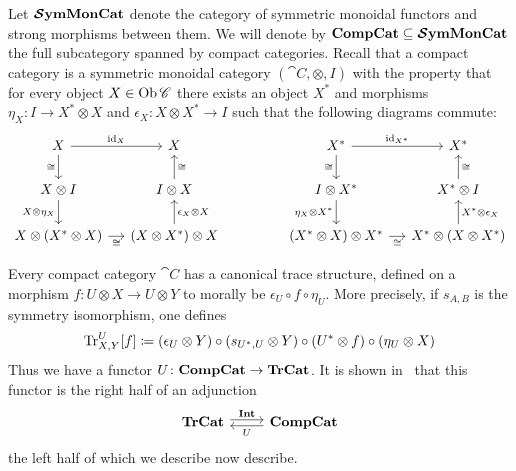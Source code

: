 \documentclass[12pt,oneside,article,draft]{memoir}
\begin{document}
Let $\bm{\mathcal{S}}\mathbf{ymMonCat}$ denote the category of symmetric monoidal functors and strong morphisms between them.
We will denote by $\mathbf{CompCat}\subseteq\bm{\mathcal{S}}\mathbf{ymMonCat}$ the full subcategory spanned by compact categories.
Recall that a compact category is a symmetric monoidal category $(\cat{C},\otimes,I)$ with the property that for every object $X\in\operatorname{Ob}\mathscr{C}$ there exists an object $X^*$ and morphisms $\eta_X\colon I\to X^*\otimes X$ and $\epsilon_X\colon X\otimes X^*\to I$ such that the following diagrams commute:
$$
   \begin{tikzcd}[column sep=small]
      X\arrow[r,"\id_X"]\arrow[d,"\cong"'] & X \\
      X\otimes I\arrow[d,"X\otimes\eta_X"'] & I\otimes X\arrow[u,"\cong"'] \\
      X\otimes(X^*\otimes X)\arrow[r,"\cong"'] & (X\otimes X^*)\otimes X\arrow[u,"\epsilon_X\otimes X"']
   \end{tikzcd}
   \hspace{.6in}
   \begin{tikzcd}[column sep=small]
      X^*\arrow[r,"\id_{X^*}"]\arrow[d,"\cong"'] & X^*\\
      I\otimes X^*\arrow[d,"\eta_X\otimes X^*"'] & X^*\otimes I\arrow[u,"\cong"'] \\
      (X^*\otimes X)\otimes X^*\arrow[r,"\cong"'] & X^*\otimes (X\otimes X^*)\arrow[u,"X^*\otimes\epsilon_X"']
   \end{tikzcd}
$$

Every compact category $\cat{C}$ has a canonical trace structure, defined on a morphism $f\colon U\otimes X\to U\otimes Y$ to morally be $\epsilon_U\circ f\circ \eta_U$.
More precisely, if $s_{A,B}$ is the symmetry isomorphism, one defines
   $$\operatorname{Tr}^U_{X,Y}[f]\coloneqq(\epsilon_U\otimes Y)\circ (s_{U^*,U}\otimes Y)\circ (U^*\otimes f)\circ (\eta_U\otimes X)$$
Thus we have a functor $U\colon\mathbf{CompCat}\to\mathbf{TrCat}$.
It is shown in~\cite{JoyalStreetVerity} that this functor is the right half of an adjunction
\begin{equation}\label{dia:traced compact adjunction}
\begin{tikzcd}
   \TrCat\arrow[r,shift left=.5ex, "\Int"]&\CompCat\arrow[l,shift left=.5ex,"U"]
\end{tikzcd}
\end{equation}
the left half of which we describe now describe.
\end{document}
